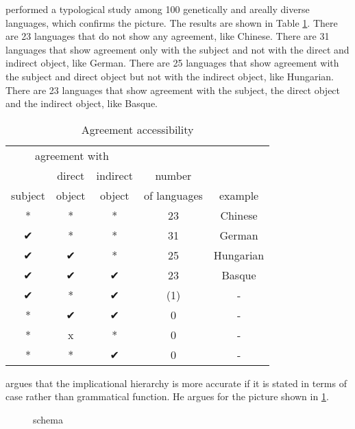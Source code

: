 \citealt{gilligan1987} performed a typological study among 100 genetically and areally diverse languages, which confirms the picture. The results are shown in Table \ref{tbl:agr-typo}. There are 23 languages that do not show any agreement, like Chinese. There are 31 languages that show agreement only with the subject and not with the direct and indirect object, like German. There are 25 languages that show agreement with the subject and direct object but not with the indirect object, like Hungarian. There are 23 languages that show agreement with the subject, the direct object and the indirect object, like Basque.

 \begin{table}[H]
   \center
   \caption {Agreement accessibility}
     \begin{tabular}[t]{ccccc}
       \toprule
           \multicolumn{3}{c}{agreement with} &              &         \\
       \cmidrule{1-3}
                    & direct & indirect       & number       &         \\
           subject  & object & object         & of languages & example \\
       \cmidrule{1-3} \cmidrule{4-4} \cmidrule{5-5}
           *    & * & * & 23  & Chinese    \\
           ✔    & * & * & 31  & German     \\
           ✔    & ✔ & * & 25  & Hungarian  \\
           ✔    & ✔ & ✔ & 23  & Basque     \\
           ✔    & * & ✔ & (1) & -          \\
           {*}  & ✔ & ✔ & 0   & -          \\
           {*}  & x & * & 0   & -          \\
           {*}  & * & ✔ & 0   & -          \\
       \bottomrule
     \end{tabular}
     \label{tbl:agr-typo}
 \end{table}

\citealt{bobaljik2006} argues that the implicational hierarchy is more accurate if it is stated in terms of case rather than grammatical function. He argues for the picture shown in \ref{fig:agr-def-dep-dat}.

\begin{figure}[H]
  \centering
  \caption{ schema}
  \label{fig:agr-def-dep-dat}
\end{figure}

